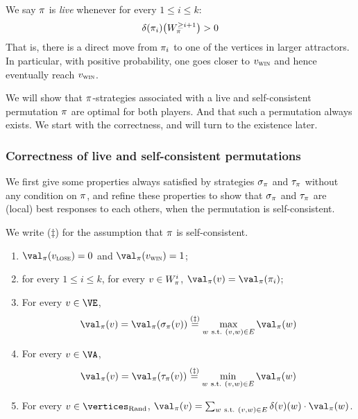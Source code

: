 We say $\pi$ is \emph{live} whenever for every $1 \le i \le k$:
\[
\delta(\pi_i)\big(W_\pi^{\ge i+1}\big)>0
\]
That is, there is a direct move from $\pi_i$ to one of the vertices
in larger attractors. In particular, with positive probability, one
goes closer to $v_{\textsc{win}}$ and hence eventually reach $v_{\textsc{win}}$.

\medskip We will show that $\pi$-strategies associated with a live
and self-consistent permutation $\pi$ are optimal for both players.
And that such a permutation always exists. We start with the
correctness, and will turn to the existence later.


\subsubsection{Correctness of live and self-consistent permutations}

We first give some properties always satisfied by strategies
$\sigma_\pi$ and $\tau_\pi$ without any condition on $\pi$, and
refine these properties to show that $\sigma_\pi$ and $\tau_\pi$
are (local) best responses to each others, when the permutation is
self-consistent.

\begin{lemma}
\label{stoch:lemma2}
We write ($\ddag$) for the assumption that $\pi$ is self-consistent.
\begin{enumerate}
\item $\val_\perm(\vlose) = 0$ and $\val_\perm(\vwin) = 1$;
\item for every $1 \le i \le k$, for every $v \in W_\pi^i$,
$\val_\perm(v) = \val_\perm(\perm_i)$;
\item For every $v \in \Evevertices$,
\[
\val_\perm(v) = \val_\perm(\sigma_\perm(v)) \stackrel{(\ddag)}{=}
\max_{w\ \text{s.t.}\ (v,w) \in E} \val_\perm(w)
\]
\item For every $v \in \Adamvertices$,
\[
\val_\perm(v) = \val_\perm(\tau_\perm(v)) \stackrel{(\ddag)}{=}
\min_{w\ \text{s.t.}\ (v,w) \in E} \val_\perm(w)
\]
\item For every $v \in \Randomvertices$, $\val_\perm(v) = \sum_{w\
  \text{s.t.}\ (v,w) \in E} \delta(v)(w) \cdot \val_\perm(w)$.
\end{enumerate}
\end{lemma}

